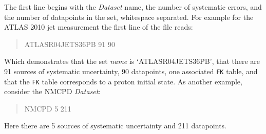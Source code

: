 \documentclass[11pt]{article}
\begin{document}
The first line begins with the \emph{Dataset} name, the number of systematic errors, and the number of datapoints in the set, whitespace separated.
For example for the ATLAS 2010 jet measurement the first line of the file reads:
\begin{quotation}\noindent
ATLASR04JETS36PB        91      90
\end{quotation}
Which demonstrates that the set \emph{name} is `ATLASR04JETS36PB', that there are 91 sources of systematic uncertainty, 90 datapoints, one associated {\tt FK} table, and that the {\tt FK} table corresponds to a proton initial state. As another example, consider the NMCPD \emph{Dataset}:
\begin{quotation}\noindent
NMCPD   5       211
\end{quotation}
Here there are 5 sources of systematic uncertainty and 211 datapoints.
\end{document}

